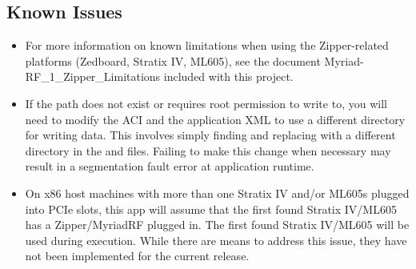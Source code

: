 \subsection{Known Issues}
\noindent
\begin{itemize}
  \item For more information on known limitations when using the Zipper-related platforms (Zedboard, Stratix IV, ML605), see the document Myriad-RF\_1\_Zipper\_Limitations included with this project.
  \item If the path  does not exist or requires root permission to write to, you will need to modify the ACI and the application XML to use a different directory for writing data. This involves simply finding and replacing  with a different directory in the  and  files. Failing to make this change when necessary may result in a segmentation fault error at application runtime.
  \item  On x86 host machines with more than one Stratix IV and/or ML605s plugged into PCIe slots, this app will assume that the first found Stratix IV/ML605 has a Zipper/MyriadRF plugged in. The first found Stratix IV/ML605 will be used during execution. While there are means to address this issue, they have not been implemented for the current release.
\end{itemize}
